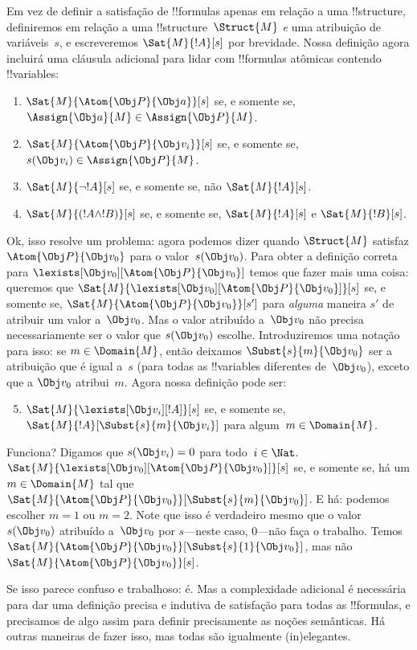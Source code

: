 \documentclass[../../../include/open-logic-section]{subfiles}
\begin{document}
Em vez de definir a satisfação de !!{formula}s apenas em relação a uma
!!{structure}, definiremos em relação a uma !!{structure}~$\Struct{M}$
\emph{e} uma atribuição de variáveis~$s$, e escreveremos
$\Sat{M}{!A}[s]$ por brevidade. Nossa definição agora incluirá uma
cláusula adicional para lidar com !!{formula}s atômicas contendo
!!{variable}s:
\begin{enumerate}
  \item $\Sat{M}{\Atom{\Obj P}{\Obj a}}[s]$ se, e somente se,
  $\Assign{\Obj a}{M} \in \Assign{\Obj P}{M}$.
  \item $\Sat{M}{\Atom{\Obj P}{\Obj v_i}}[s]$ se, e somente se,
  $s(\Obj v_i) \in \Assign{\Obj P}{M}$.
  \item $\Sat{M}{\lnot !A}[s]$ se, e somente se, não $\Sat{M}{!A}[s]$.
  \item $\Sat{M}{(!A \land !B)}[s]$ se, e somente se, $\Sat{M}{!A}[s]$ e
  $\Sat{M}{!B}[s]$.
\end{enumerate}
Ok, isso resolve um problema: agora podemos dizer quando $\Struct{M}$
satisfaz $\Atom{\Obj P}{\Obj v_0}$ para o valor~$s(\Obj v_0)$. Para
obter a definição correta para $\lexists[\Obj v_0][\Atom{\Obj P}{\Obj
v_0}]$ temos que fazer mais uma coisa: queremos que
$\Sat{M}{\lexists[\Obj v_0][\Atom{\Obj P}{\Obj v_0}]}[s]$ se, e somente
se, $\Sat{M}{\Atom{\Obj P}{\Obj v_0}}[s']$ para \emph{alguma} maneira
$s'$ de atribuir um valor a~$\Obj v_0$. Mas o valor atribuído a~$\Obj
v_0$ não precisa necessariamente ser o valor que $s(\Obj v_0)$ escolhe.
Introduziremos uma notação para isso: se $m \in \Domain{M}$, então
deixamos $\Subst{s}{m}{\Obj v_0}$ ser a atribuição que é igual a~$s$
(para todas as !!{variable}s diferentes de~$\Obj v_0$), exceto que a
$\Obj v_0$ atribui~$m$. Agora nossa definição pode ser:
\begin{enumerate}\setcounter{enumi}{4}
  \item $\Sat{M}{\lexists[\Obj v_i][!A]}[s]$ se, e somente se,
  $\Sat{M}{!A}[\Subst{s}{m}{\Obj v_i}]$ para algum~$m \in \Domain{M}$.
\end{enumerate}
Funciona? Digamos que $s(\Obj v_i) = 0$ para todo~$i \in \Nat$.
$\Sat{M}{\lexists[\Obj v_0][\Atom{\Obj P}{\Obj v_0}]}[s]$ se, e somente
se, há um $m \in \Domain{M}$ tal que $\Sat{M}{\Atom{\Obj P}{\Obj
v_0}}[\Subst{s}{m}{\Obj v_0}]$. E há: podemos escolher $m = 1$ ou
$m = 2$. Note que isso é verdadeiro mesmo que o valor~$s(\Obj v_0)$
atribuído a~$\Obj v_0$ por $s$---neste caso, $0$---não faça o
trabalho. Temos $\Sat{M}{\Atom{\Obj P}{\Obj v_0}}[\Subst{s}{1}{\Obj
v_0}]$, mas não $\Sat{M}{\Atom{\Obj P}{\Obj v_0}}[s]$.

Se isso parece confuso e trabalhoso: é. Mas a complexidade adicional é
necessária para dar uma definição precisa e indutiva de satisfação para
todas as !!{formula}s, e precisamos de algo assim para definir
precisamente as noções semânticas.  Há outras maneiras de fazer isso,
mas todas são igualmente (in)elegantes.
\end{document}
